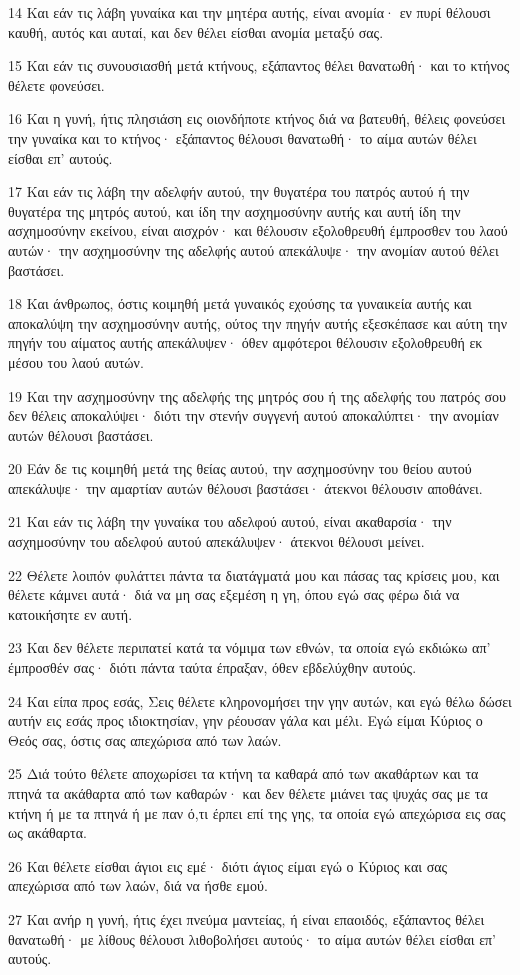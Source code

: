 \par 14 Και εάν τις λάβη γυναίκα και την μητέρα αυτής, είναι ανομία· εν πυρί θέλουσι καυθή, αυτός και αυταί, και δεν θέλει είσθαι ανομία μεταξύ σας.
\par 15 Και εάν τις συνουσιασθή μετά κτήνους, εξάπαντος θέλει θανατωθή· και το κτήνος θέλετε φονεύσει.
\par 16 Και η γυνή, ήτις πλησιάση εις οιονδήποτε κτήνος διά να βατευθή, θέλεις φονεύσει την γυναίκα και το κτήνος· εξάπαντος θέλουσι θανατωθή· το αίμα αυτών θέλει είσθαι επ' αυτούς.
\par 17 Και εάν τις λάβη την αδελφήν αυτού, την θυγατέρα του πατρός αυτού ή την θυγατέρα της μητρός αυτού, και ίδη την ασχημοσύνην αυτής και αυτή ίδη την ασχημοσύνην εκείνου, είναι αισχρόν· και θέλουσιν εξολοθρευθή έμπροσθεν του λαού αυτών· την ασχημοσύνην της αδελφής αυτού απεκάλυψε· την ανομίαν αυτού θέλει βαστάσει.
\par 18 Και άνθρωπος, όστις κοιμηθή μετά γυναικός εχούσης τα γυναικεία αυτής και αποκαλύψη την ασχημοσύνην αυτής, ούτος την πηγήν αυτής εξεσκέπασε και αύτη την πηγήν του αίματος αυτής απεκάλυψεν· όθεν αμφότεροι θέλουσιν εξολοθρευθή εκ μέσου του λαού αυτών.
\par 19 Και την ασχημοσύνην της αδελφής της μητρός σου ή της αδελφής του πατρός σου δεν θέλεις αποκαλύψει· διότι την στενήν συγγενή αυτού αποκαλύπτει· την ανομίαν αυτών θέλουσι βαστάσει.
\par 20 Εάν δε τις κοιμηθή μετά της θείας αυτού, την ασχημοσύνην του θείου αυτού απεκάλυψε· την αμαρτίαν αυτών θέλουσι βαστάσει· άτεκνοι θέλουσιν αποθάνει.
\par 21 Και εάν τις λάβη την γυναίκα του αδελφού αυτού, είναι ακαθαρσία· την ασχημοσύνην του αδελφού αυτού απεκάλυψεν· άτεκνοι θέλουσι μείνει.
\par 22 Θέλετε λοιπόν φυλάττει πάντα τα διατάγματά μου και πάσας τας κρίσεις μου, και θέλετε κάμνει αυτά· διά να μη σας εξεμέση η γη, όπου εγώ σας φέρω διά να κατοικήσητε εν αυτή.
\par 23 Και δεν θέλετε περιπατεί κατά τα νόμιμα των εθνών, τα οποία εγώ εκδιώκω απ' έμπροσθέν σας· διότι πάντα ταύτα έπραξαν, όθεν εβδελύχθην αυτούς.
\par 24 Και είπα προς εσάς, Σεις θέλετε κληρονομήσει την γην αυτών, και εγώ θέλω δώσει αυτήν εις εσάς προς ιδιοκτησίαν, γην ρέουσαν γάλα και μέλι. Εγώ είμαι Κύριος ο Θεός σας, όστις σας απεχώρισα από των λαών.
\par 25 Διά τούτο θέλετε αποχωρίσει τα κτήνη τα καθαρά από των ακαθάρτων και τα πτηνά τα ακάθαρτα από των καθαρών· και δεν θέλετε μιάνει τας ψυχάς σας με τα κτήνη ή με τα πτηνά ή με παν ό,τι έρπει επί της γης, τα οποία εγώ απεχώρισα εις σας ως ακάθαρτα.
\par 26 Και θέλετε είσθαι άγιοι εις εμέ· διότι άγιος είμαι εγώ ο Κύριος και σας απεχώρισα από των λαών, διά να ήσθε εμού.
\par 27 Και ανήρ η γυνή, ήτις έχει πνεύμα μαντείας, ή είναι επαοιδός, εξάπαντος θέλει θανατωθή· με λίθους θέλουσι λιθοβολήσει αυτούς· το αίμα αυτών θέλει είσθαι επ' αυτούς.

